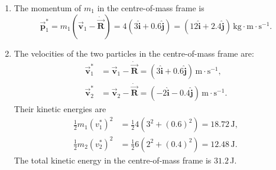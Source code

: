 \documentclass[12pt]{article}
\begin{document}
\begin{enumerate}
\begin{enumerate}
  \item The momentum of $m_1$ in the centre-of-mass frame is
    \begin{displaymath}
      \vec{\boldsymbol{p}}_1^{\ast} = m_1(\vec{\boldsymbol{v}}_1 - \dot{\vec{\boldsymbol{R}}}) = 4(3\boldsymbol{\hat{i}} + 0.6\boldsymbol{\hat{j}})
      = (12\boldsymbol{\hat{i}} + 2.4\boldsymbol{\hat{j}}) \, \text{kg}\cdot\text{m}\cdot\text{s}^{-1}.
      \end{displaymath}

  \item The velocities of the two particles in the centre-of-mass frame
    are:
    \begin{align*}
      \vec{\boldsymbol{v}}_1^{\ast} &= \vec{\boldsymbol{v}}_1 - \dot{\vec{\boldsymbol{R}}} = (3\boldsymbol{\hat{i}} +
                     0.6\boldsymbol{\hat{j}})\,\text{m}\cdot\text{s}^{-1}, \\
      \vec{\boldsymbol{v}}_2^{\ast} &= \vec{\boldsymbol{v}}_2 - \dot{\vec{\boldsymbol{R}}} = (-2\boldsymbol{\hat{i}} -
                     0.4\boldsymbol{\hat{j}})\,\text{m}\cdot\text{s}^{-1}.
    \end{align*}
    Their kinetic energies are
    \begin{align*}
      \frac{1}{2}m_1 (v_1^{\ast})^2 &= \frac{1}{2} 4 \left ( 3^2 +
                                      (0.6)^2 \right ) =
                                      18.72\,\text{J}, \\
      \frac{1}{2}m_2 (v_2^{\ast})^2 &= \frac{1}{2} 6 \left ( 2^2 +
                                      (0.4)^2 \right ) =
                                      12.48\,\text{J}.
    \end{align*}
    The total kinetic energy in the centre-of-mass frame is $31.2\,$J.

  \end{enumerate}


\end{enumerate}
\end{document}

